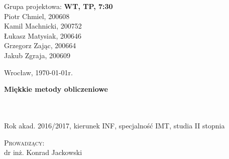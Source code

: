 \noindent
\begin{minipage}[t]{.5\linewidth}
	\begin{flushleft}
		Grupa projektowa: \textbf{WT, TP, 7:30}\\
		\vspace{0.8cm}
		Piotr Chmiel, 200608\\
		Kamil Machnicki, 200752\\
		Łukasz Matysiak, 200646\\
		Grzegorz Zając, 200664\\
		Jakub Zgraja, 200609\\
	\end{flushleft} 
\end{minipage}%
\begin{minipage}[t]{.5\linewidth}
	\begin{flushright}
		Wrocław, \today r.\\
		\vspace{.35cm}

	\end{flushright}
\end{minipage}

\begin{center}

\vspace{3.0cm}
{\Huge\bf Miękkie metody obliczeniowe}\\

 \\ 
 \\
	
\vspace{1cm}

{\large Rok akad. 2016/2017, kierunek INF, specjalność IMT, studia II stopnia}

\vspace{2cm}

\textsc{Prowadzący:}\\
dr inż. Konrad Jackowski

\end{center}
